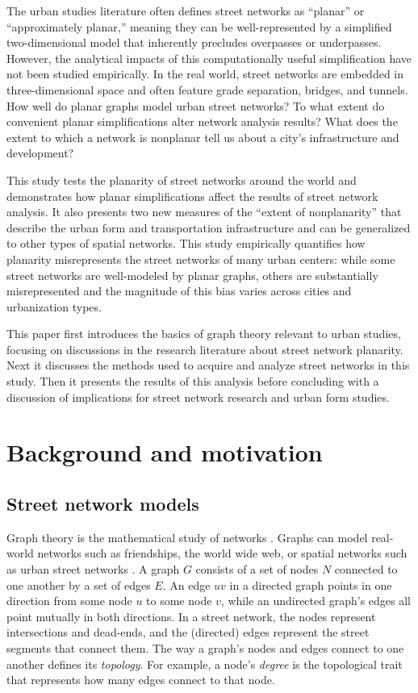 \documentclass[Afour,doublespace,sageh,times]{sagej}
\begin{document}
The urban studies literature often defines street networks as \enquote{planar} or \enquote{approximately planar,} meaning they can be well-represented by a simplified two-dimensional model that inherently precludes overpasses or underpasses. However, the analytical impacts of this computationally useful simplification have not been studied empirically. In the real world, street networks are embedded in three-dimensional space and often feature grade separation, bridges, and tunnels. How well do planar graphs model urban street networks? To what extent do convenient planar simplifications alter network analysis results? What does the extent to which a network is nonplanar tell us about a city's infrastructure and development?

This study tests the planarity of street networks around the world and demonstrates how planar simplifications affect the results of street network analysis. It also presents two new measures of the \enquote{extent of nonplanarity} that describe the urban form and transportation infrastructure and can be generalized to other types of spatial networks. This study empirically quantifies how planarity misrepresents the street networks of many urban centers: while some street networks are well-modeled by planar graphs, others are substantially misrepresented and the magnitude of this bias varies across cities and urbanization types.

This paper first introduces the basics of graph theory relevant to urban studies, focusing on discussions in the research literature about street network planarity. Next it discusses the methods used to acquire and analyze street networks in this study. Then it presents the results of this analysis before concluding with a discussion of implications for street network research and urban form studies.



\section{Background and motivation}

\subsection{Street network models}

Graph theory is the mathematical study of networks \citep{newman_networks:_2010}. Graphs can model real-world networks such as friendships, the world wide web, or spatial networks such as urban street networks \citep{barthelemy_spatial_2011}. A graph $G$ consists of a set of nodes $N$ connected to one another by a set of edges $E$. An edge $uv$ in a directed graph points in one direction from some node $u$ to some node $v$, while an undirected graph's edges all point mutually in both directions. In a street network, the nodes represent intersections and dead-ends, and the (directed) edges represent the street segments that connect them. The way a graph's nodes and edges connect to one another defines its \emph{topology}. For example, a node's \emph{degree} is the topological trait that represents how many edges connect to that node.
\end{document}
